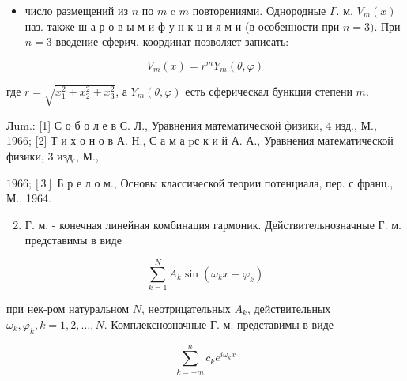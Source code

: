 \documentclass[10pt]{article}
\begin{document}
\begin{itemize}

  \item число размещений из $n$ по $m$ c $m$ повторениями. Однородные $\Gamma$. м. $V_{m}(x)$ наз. также ш а р о в ы м и ф у н к ц и я м и (в особенности при $n=3)$. При $n=3$ введение сферич. координат позволяет записать:

\end{itemize}



\[

V_{m}(x)=r^{m} Y_{m}(\theta, \varphi)

\]



где $r=\sqrt{x_{1}^{2}+x_{2}^{2}+x_{3}^{2}}$, а $Y_{m}(\theta, \varphi)$ есть сферическал бункция степени $m$.



Лum.: [1] С о б о л е в С. Л., Уравнения математической физики, 4 изд., М., 1966; [2] Т и х о н о в А. Н., С а м а pс к и й А. А., Уравнения математической физики, 3 изд., М.,

$1966 ;[3]$ Б р е л о м., Основы классической теории потенциала, пер. с франц., М., 1964.



\begin{enumerate}

  \setcounter{enumi}{1}

  \item Г. м. - конечная линейная комбинация гармоник. Действительнозначные Г. м. представимы в виде

\end{enumerate}



\[

\sum_{k=1}^{N} A_{k} \sin \left(\omega_{k} x+\varphi_{k}\right)

\]



при нек-ром натуральном $N$, неотрицательных $A_{k}$, действительных $\omega_{k}, \varphi_{k}, k=1,2, \ldots, N$. Комплекснозначные Г. м. представимы в виде



\[

\sum_{k=-m}^{n} c_{k} e^{i \omega_{k} x}

\]
\end{document}
